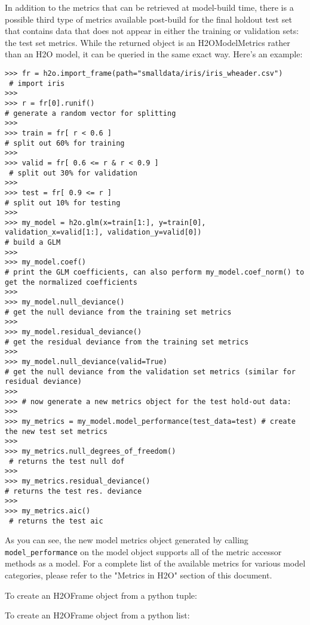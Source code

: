 In addition to the metrics that can be retrieved at model-build time, there is a possible third type of metrics available post-build for the final holdout test set that contains data that does not appear in either the training or validation sets: the test set metrics. While the returned object is an H2OModelMetrics rather than an H2O model, it can be queried in the same exact way. Here's an example:
\begin{lstlisting}[style=python]
>>> fr = h2o.import_frame(path="smalldata/iris/iris_wheader.csv")  
 # import iris
>>>
>>> r = fr[0].runif()                       
# generate a random vector for splitting
>>>
>>> train = fr[ r < 0.6 ]                   
# split out 60% for training
>>>
>>> valid = fr[ 0.6 <= r & r < 0.9 ]       
 # split out 30% for validation
>>>
>>> test = fr[ 0.9 <= r ]                   
# split out 10% for testing
>>>
>>> my_model = h2o.glm(x=train[1:], y=train[0], validation_x=valid[1:], validation_y=valid[0])  
# build a GLM
>>>
>>> my_model.coef()                         
# print the GLM coefficients, can also perform my_model.coef_norm() to get the normalized coefficients
>>>
>>> my_model.null_deviance()                
# get the null deviance from the training set metrics
>>>
>>> my_model.residual_deviance()            
# get the residual deviance from the training set metrics
>>>
>>> my_model.null_deviance(valid=True)      
# get the null deviance from the validation set metrics (similar for residual deviance)
>>>
>>> # now generate a new metrics object for the test hold-out data:
>>>
>>> my_metrics = my_model.model_performance(test_data=test) # create the new test set metrics
>>>
>>> my_metrics.null_degrees_of_freedom()   
 # returns the test null dof
>>>
>>> my_metrics.residual_deviance()          
# returns the test res. deviance
>>>
>>> my_metrics.aic()                       
 # returns the test aic
\end{lstlisting}

As you can see, the new model metrics object generated by calling \texttt{model\_performance} on the model object supports all of the metric accessor methods as a model. For a complete list of the available metrics for various model categories, please refer to the "Metrics in H2O" section of this document.

To create an H2OFrame object from a python tuple:


To create an H2OFrame object from a python list:


